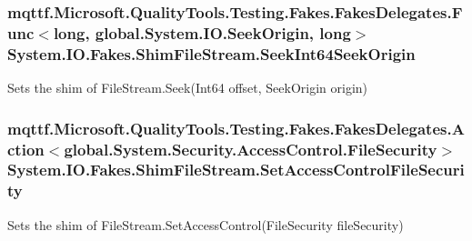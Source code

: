 \hypertarget{class_system_1_1_i_o_1_1_fakes_1_1_shim_file_stream_a40433417dbecaf685cd629c4c7289bf1}{
\subsubsection[{Seek\-Int64\-Seek\-Origin}]{\setlength{\rightskip}{0pt plus 5cm}mqttf.\-Microsoft.\-Quality\-Tools.\-Testing.\-Fakes.\-Fakes\-Delegates.\-Func$<$long, global.\-System.\-I\-O.\-Seek\-Origin, long$>$ System.\-I\-O.\-Fakes.\-Shim\-File\-Stream.\-Seek\-Int64\-Seek\-Origin\hspace{0.3cm}{\ttfamily [set]}}}\label{class_system_1_1_i_o_1_1_fakes_1_1_shim_file_stream_a40433417dbecaf685cd629c4c7289bf1}


Sets the shim of File\-Stream.\-Seek(\-Int64 offset, Seek\-Origin origin)

\hypertarget{class_system_1_1_i_o_1_1_fakes_1_1_shim_file_stream_a6b6deffaeb32316857082b409f352597}{
\subsubsection[{Set\-Access\-Control\-File\-Security}]{\setlength{\rightskip}{0pt plus 5cm}mqttf.\-Microsoft.\-Quality\-Tools.\-Testing.\-Fakes.\-Fakes\-Delegates.\-Action$<$global.\-System.\-Security.\-Access\-Control.\-File\-Security$>$ System.\-I\-O.\-Fakes.\-Shim\-File\-Stream.\-Set\-Access\-Control\-File\-Security\hspace{0.3cm}{\ttfamily [set]}}}\label{class_system_1_1_i_o_1_1_fakes_1_1_shim_file_stream_a6b6deffaeb32316857082b409f352597}


Sets the shim of File\-Stream.\-Set\-Access\-Control(\-File\-Security file\-Security)

